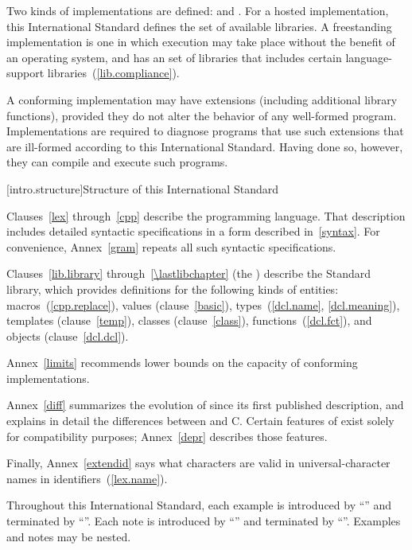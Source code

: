 \pnum
Two kinds of implementations are defined:  and
. For a hosted implementation, this
International Standard defines the set of available libraries. A freestanding
implementation is one in which execution may take place without the benefit of
an operating system, and has an  set of libraries that includes certain language-support
libraries~(\ref{lib.compliance}).

\pnum
A conforming implementation may have extensions (including
additional library functions), provided they do not alter the
behavior of any well-formed program.
Implementations are required to diagnose programs that use such
extensions that are ill-formed according to this International Standard.
Having done so, however, they can compile and execute such programs.
%
%

[intro.structure]{Structure of this International Standard}

\pnum
{}%
%
Clauses~\ref{lex} through~\ref{cpp} describe the \Cpp  programming
language. That description includes detailed syntactic specifications in
a form described in~\ref{syntax}. For convenience, Annex~\ref{gram}
repeats all such syntactic specifications.

\pnum
Clauses~\ref{lib.library} through~\ref{\lastlibchapter}
(the ) describe the Standard \Cpp  library,
which provides definitions for the following kinds of entities:
macros~(\ref{cpp.replace}), values (clause~\ref{basic}),
types~(\ref{dcl.name}, \ref{dcl.meaning}),
templates (clause~\ref{temp}), classes (clause~\ref{class}),
functions~(\ref{dcl.fct}), and objects (clause~\ref{dcl.dcl}).

\pnum
Annex~\ref{limits} recommends lower bounds on the capacity of conforming
implementations.

\pnum
Annex~\ref{diff} summarizes the evolution of \Cpp  since its first
published description, and explains in detail the differences between
\Cpp  and C. Certain features of \Cpp  exist solely for compatibility
purposes; Annex~\ref{depr} describes those features.

\pnum
Finally, Annex~\ref{extendid} says what characters are valid in
universal-character names in \Cpp identifiers~(\ref{lex.name}).

\pnum
Throughout this International Standard, each example is introduced by
``\enterexample'' and terminated by ``\exitexample''. Each note is
introduced by ``\enternote'' and terminated by ``\exitnote''. Examples
and notes may be nested.%

